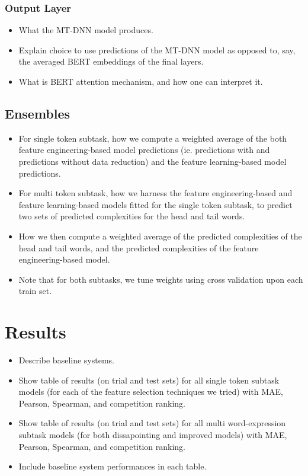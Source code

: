 \documentclass[11pt,a4paper]{article}
\begin{document}
\subsubsection{Output Layer}
\begin{itemize}
  \item What the MT-DNN model produces.
  \item Explain choice to use predictions of the MT-DNN model as opposed to, say, the averaged BERT embeddings of the final layers.
  \item What is BERT attention mechanism, and how one can interpret it.
\end{itemize}

\subsection{Ensembles}
\begin{itemize}
  \item For single token subtask, how we compute a weighted average of the both feature engineering-based model predictions (ie. predictions with and predictions without data reduction) and the feature learning-based model predictions.
  \item For multi token subtask, how we harness the feature engineering-based and feature learning-based models fitted for the single token subtask, to predict two sets of predicted complexities for the head and tail words.
  \item How we then compute a weighted average of the predicted complexities of the head and tail words, and the predicted complexities of the feature engineering-based model.
  \item Note that for both subtasks, we tune weights using cross validation upon each train set.
\end{itemize}

\section{Results}

\begin{itemize}
  \item Describe baseline systems.
  \item Show table of results (on trial and test sets) for all single token subtask models (for each of the feature selection techniques we tried) with MAE, Pearson, Spearman, and competition ranking.
  \item Show table of results (on trial and test sets) for all multi word-expression subtask models (for both dissapointing and improved models) with MAE, Pearson, Spearman, and competition ranking.
  \item Include baseline system performances in each table.
\end{itemize}
\end{document}
